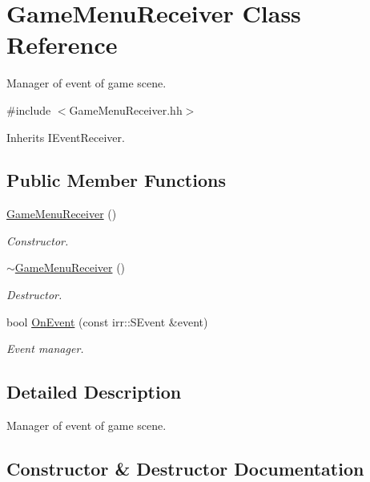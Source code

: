 \hypertarget{classGameMenuReceiver}{}\section{Game\+Menu\+Receiver Class Reference}
\label{classGameMenuReceiver}


Manager of event of game scene.  




{\ttfamily \#include $<$Game\+Menu\+Receiver.\+hh$>$}



Inherits I\+Event\+Receiver.

\subsection*{Public Member Functions}
\begin{DoxyCompactItemize}
\item 
\hyperlink{classGameMenuReceiver_a5dd735dbdeddd9f11a999c9f0c4210e8}{Game\+Menu\+Receiver} ()
\begin{DoxyCompactList}\small\item\em Constructor. \end{DoxyCompactList}\item 
\hyperlink{classGameMenuReceiver_a490afacab72bebb8b1f28c3977f9ed44}{$\sim$\+Game\+Menu\+Receiver} ()
\begin{DoxyCompactList}\small\item\em Destructor. \end{DoxyCompactList}\item 
bool \hyperlink{classGameMenuReceiver_af6774556abc7e3718b7bf904cc62ead0}{On\+Event} (const irr\+::\+S\+Event \&event)
\begin{DoxyCompactList}\small\item\em Event manager. \end{DoxyCompactList}\end{DoxyCompactItemize}


\subsection{Detailed Description}
Manager of event of game scene. 

\subsection{Constructor \& Destructor Documentation}
\mbox{\label{classGameMenuReceiver_a5dd735dbdeddd9f11a999c9f0c4210e8}} 
